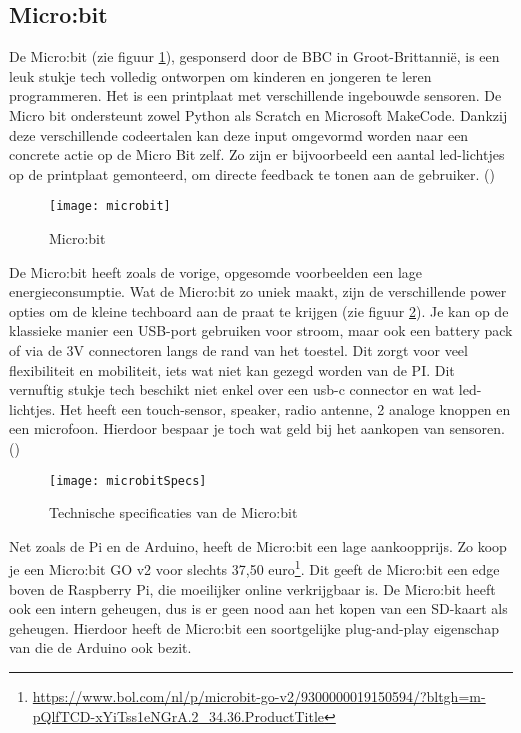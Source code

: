 \subsection{Micro:bit }
De Micro:bit (zie figuur \ref{fig:microbit1}), gesponserd door de BBC in Groot-Brittannië, is een leuk stukje tech volledig ontworpen om kinderen en jongeren te leren programmeren. Het is een printplaat met verschillende ingebouwde sensoren. De Micro bit ondersteunt zowel Python als Scratch en Microsoft MakeCode. Dankzij deze verschillende codeertalen kan deze input omgevormd worden naar een concrete actie op de Micro Bit zelf. Zo zijn er bijvoorbeeld een aantal led-lichtjes op de printplaat gemonteerd, om directe feedback te tonen aan de gebruiker. (\cite{Stager2018})


\begin{figure}
    \texttt{[image: microbit]}
    \caption{Micro:bit}
    \label{fig:microbit1}
\end{figure}

De Micro:bit heeft zoals de vorige, opgesomde voorbeelden een lage energieconsumptie. Wat de Micro:bit zo uniek maakt, zijn de verschillende power opties om de kleine techboard aan de praat te krijgen (zie figuur \ref{fig:microbit2}). Je kan op de klassieke manier een USB-port gebruiken voor stroom, maar ook een battery pack of via de 3V connectoren langs de rand van het toestel. Dit zorgt voor veel flexibiliteit en mobiliteit, iets wat niet kan gezegd worden van de PI.
Dit vernuftig stukje tech beschikt niet enkel over een usb-c connector en wat led-lichtjes. Het heeft een touch-sensor, speaker, radio antenne, 2 analoge knoppen en een microfoon. Hierdoor bespaar je toch wat geld bij het aankopen van sensoren. (\cite{Stager2018})

\begin{figure}
    \texttt{[image: microbitSpecs]}
    \caption{Technische specificaties van de Micro:bit}
    \label{fig:microbit2}
\end{figure}

Net zoals de Pi en de Arduino, heeft de Micro:bit een lage aankoopprijs. Zo koop je een Micro:bit GO v2 voor slechts 37,50 euro\footnote{\url{https://www.bol.com/nl/p/microbit-go-v2/9300000019150594/?bltgh=m-pQlfTCD-xYiTss1eNGrA.2_34.36.ProductTitle}}. Dit geeft de Micro:bit een edge boven de Raspberry Pi, die moeilijker online verkrijgbaar is. De Micro:bit heeft ook een intern geheugen, dus is er geen nood aan het kopen van een SD-kaart als geheugen. Hierdoor heeft de Micro:bit een soortgelijke plug-and-play eigenschap van die de Arduino ook bezit.

